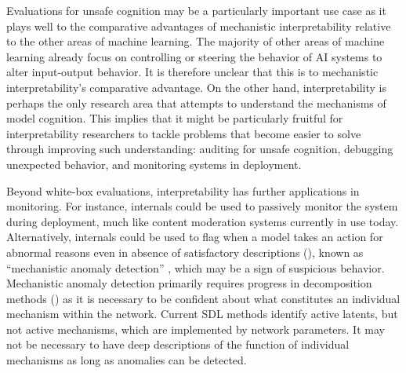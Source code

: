 Evaluations for unsafe cognition may be a particularly important use case as it plays well to the comparative advantages of mechanistic interpretability relative to the other areas of machine learning. The majority of other areas of machine learning already focus on controlling or steering the behavior of AI systems to alter input-output behavior. It is therefore unclear that this is to mechanistic interpretability's comparative advantage. On the other hand, interpretability is perhaps the only research area that attempts to understand the mechanisms of model cognition. This implies that it might be particularly fruitful for interpretability researchers to tackle problems that become easier to solve through improving such understanding: auditing for unsafe cognition, debugging unexpected behavior, and monitoring systems in deployment.

\label{par:monitoring}

Beyond white-box evaluations, interpretability has further applications in monitoring. For instance, internals could be used to passively monitor the system during deployment, much like content moderation systems currently in use today. Alternatively, internals could be used to flag when a model takes an action for abnormal reasons even in absence of satisfactory descriptions (), known as “mechanistic anomaly detection” \citep{Christiano_2022_MAD,Johnston_2024_MAD}, which may be a sign of suspicious behavior. Mechanistic anomaly detection primarily requires progress in decomposition methods () as it is necessary to be confident about what constitutes an individual mechanism within the network. Current SDL methods identify active latents, but not active mechanisms, which are implemented by network parameters. It may not be necessary to have deep descriptions of the function of individual mechanisms as long as anomalies can be detected.

\label{par:red-teaming}


